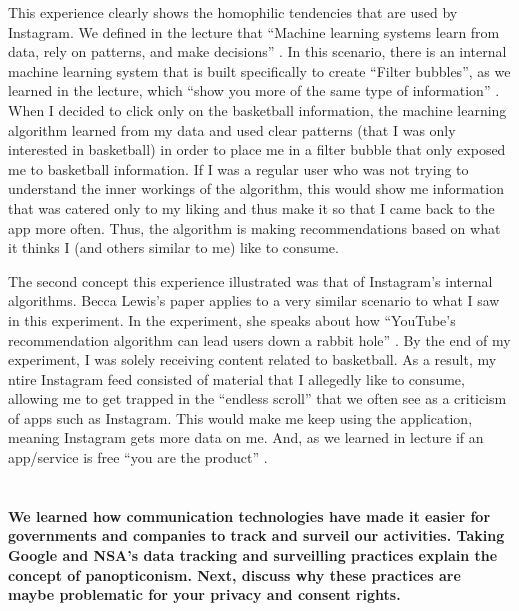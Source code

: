 \documentclass[a4paper]{article}
\begin{document}
        This experience clearly shows the homophilic tendencies that are used by Instagram. 
        We defined in the lecture that “Machine learning systems learn from data, rely on patterns, 
        and make decisions” \citep{lesson6}. In this scenario, there is an internal
        machine learning system that is built specifically to create “Filter bubbles”, as we 
        learned in the lecture, which “show you more of the same type of information” \citep{lesson6}. When I decided to click only on the basketball information, the 
        machine learning algorithm learned from my data and used clear patterns (that I was 
        only interested in basketball) in order to place me in a filter bubble that only exposed 
        me to basketball information. If I was a regular user who was not trying to understand 
        the inner workings of the algorithm, this would show me information that was catered 
        only to my liking and thus make it so that I came back to the app more often. Thus, 
        the algorithm is making recommendations based on what it thinks I (and others similar to 
        me) like to consume. 

        The second concept this experience illustrated was that of Instagram’s internal 
        algorithms. Becca Lewis’s paper applies to a very similar scenario to what I saw 
        in this experiment. In the experiment, she speaks about how “YouTube’s recommendation 
        algorithm can lead users down a rabbit hole” \citep{lesson6}. By the end of my 
        experiment, I was solely receiving content related to basketball. As a result, my 
        ntire Instagram feed consisted of material that I allegedly like to consume, allowing 
        me to get trapped in the “endless scroll” that we often see as a criticism of apps 
        such as Instagram. This would make me keep using the application, meaning Instagram 
        gets more data on me. And, as we learned in lecture if an app/service is free “you are 
        the product” \citep{lesson6}. 


    \section{}
        \textbf{ We learned how communication technologies have made it easier for governments and companies to track and surveil our activities. Taking Google and NSA’s data tracking and surveilling practices explain the concept of panopticonism. Next, discuss why these practices are maybe problematic for your privacy and consent rights.}
        
\end{document}
